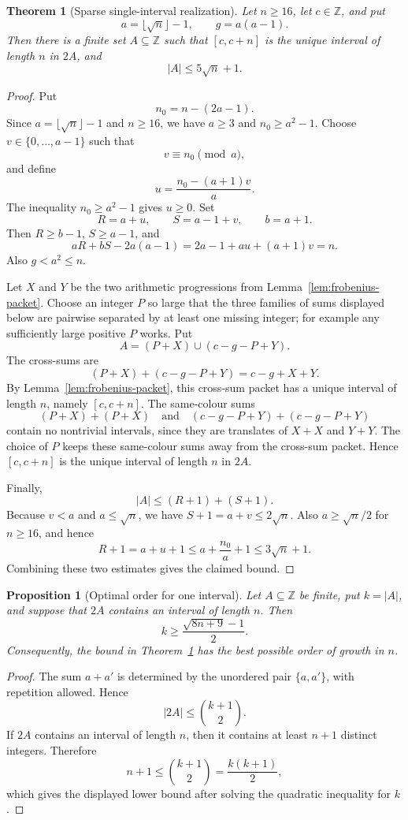 \documentclass[11pt]{article}
\newtheorem{theorem}{Theorem}
\newtheorem{proposition}{Proposition}
\newcommand{\Z}{\mathbb{Z}}
\begin{document}
\begin{theorem}[Sparse single-interval realization]\label{thm:sparse-single}
Let $n\geq 16$, let $c\in\Z$, and put
\[
 a=\lfloor\sqrt n\rfloor-1,
 \qquad
 g=a(a-1).
\]
Then there is a finite set $A\subseteq\Z$ such that $[c,c+n]$ is the unique
interval of length $n$ in $2A$, and
\[
 |A|\leq 5\sqrt n+1.
\]
\end{theorem}

\begin{proof}
Put
\[
 n_0=n-(2a-1).
\]
Since $a=\lfloor\sqrt n\rfloor-1$ and $n\geq 16$, we have $a\geq 3$ and
$n_0\geq a^2-1$. Choose $v\in\{0,\ldots,a-1\}$ such that
\[
 v\equiv n_0\pmod a,
\]
and define
\[
 u=\frac{n_0-(a+1)v}{a}.
\]
The inequality $n_0\geq a^2-1$ gives $u\geq 0$. Set
\[
 R=a+u,\qquad S=a-1+v,\qquad b=a+1.
\]
Then $R\geq b-1$, $S\geq a-1$, and
\[
 aR+bS-2a(a-1)
 =2a-1+au+(a+1)v
 =n.
\]
Also $g<a^2\leq n$.

Let $X$ and $Y$ be the two arithmetic progressions from
Lemma~\ref{lem:frobenius-packet}. Choose an integer $P$ so large that the
three families of sums displayed below are pairwise separated by at least one
missing integer; for example any sufficiently large positive $P$ works. Put
\[
 A=(P+X)\cup(c-g-P+Y).
\]
The cross-sums are
\[
 (P+X)+(c-g-P+Y)=c-g+X+Y.
\]
By Lemma~\ref{lem:frobenius-packet}, this cross-sum packet has a unique
interval of length $n$, namely $[c,c+n]$. The same-colour sums
\[
 (P+X)+(P+X)
 \quad\text{and}\quad
 (c-g-P+Y)+(c-g-P+Y)
\]
contain no nontrivial intervals, since they are translates of $X+X$ and
$Y+Y$. The choice of $P$ keeps these same-colour sums away from the cross-sum
packet. Hence $[c,c+n]$ is the unique interval of length $n$ in $2A$.

Finally,
\[
 |A|\leq (R+1)+(S+1).
\]
Because $v<a$ and $a\leq\sqrt n$, we have $S+1=a+v\leq 2\sqrt n$. Also
$a\geq \sqrt n/2$ for $n\geq 16$, and hence
\[
 R+1=a+u+1\leq a+\frac{n_0}{a}+1\leq 3\sqrt n+1.
\]
Combining these two estimates gives the claimed bound.
\end{proof}

\begin{proposition}[Optimal order for one interval]\label{prop:sparse-lower}
Let $A\subseteq\Z$ be finite, put $k=|A|$, and suppose that $2A$ contains an
interval of length $n$. Then
\[
 k\geq \frac{\sqrt{8n+9}-1}{2}.
\]
Consequently, the bound in Theorem~\ref{thm:sparse-single} has the best
possible order of growth in $n$.
\end{proposition}

\begin{proof}
The sum $a+a'$ is determined by the unordered pair $\{a,a'\}$, with repetition
allowed. Hence
\[
 |2A|\leq \binom{k+1}{2}.
\]
If $2A$ contains an interval of length $n$, then it contains at least $n+1$
distinct integers. Therefore
\[
 n+1\leq \binom{k+1}{2}=\frac{k(k+1)}2,
\]
which gives the displayed lower bound after solving the quadratic inequality
for $k$.
\end{proof}
\end{document}
